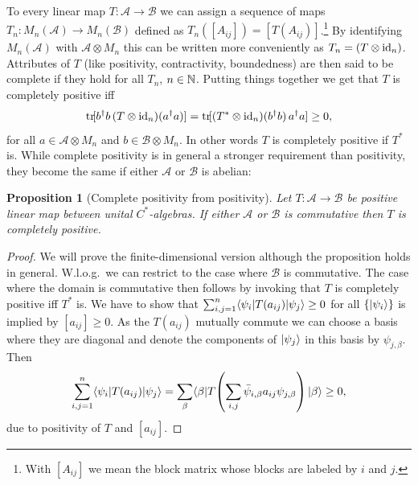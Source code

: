 \documentclass[11pt,a4paper]{article}
\theoremstyle{plain}
\newtheorem{proposition}{Proposition}[section]
\theoremstyle{definition}
\theoremstyle{remark}
\numberwithin{equation}{section}
\begin{document}
To every linear map $T:\mathcal{A}\to \mathcal{B}$ we can assign a sequence of maps $T_n:M_n(\mathcal{A})\to M_n(\mathcal{B})$ defined as $T_n([A_{ij}])=[T(A_{ij})]$.\footnote{With $[A_{ij}]$ we mean the block matrix whose blocks are labeled by $i$ and $j$.} By identifying $M_n(\mathcal{A})$ with $\mathcal{A}\otimes M_n$ this can be written more conveniently as $T_n=(T\otimes \mathrm{id}_n)$. Attributes of $T$ (like positivity, contractivity, boundedness) are then said to be complete if they hold for all $T_n$, $n\in \mathbb{N}$. Putting things together we get that $T$ is completely positive iff
\begin{equation}
    \operatorname{tr}\![b^\dagger b\,(T\otimes \mathrm{id}_n)(a^\dagger a)]
    = \operatorname{tr}\![(T^\ast\otimes \mathrm{id}_n)(b^\dagger b)\,a^\dagger a]\ge 0,
\end{equation}
for all $a\in \mathcal{A}\otimes M_n$ and $b\in \mathcal{B}\otimes M_n$. In other words $T$ is completely positive if $T^\ast$ is. While complete positivity is in general a stronger requirement than positivity, they become the same if either $\mathcal{A}$ or $\mathcal{B}$ is abelian:

\begin{proposition}[Complete positivity from positivity]
    Let $T:\mathcal{A}\to \mathcal{B}$ be positive linear map between unital $C^\ast$-algebras. If either $\mathcal{A}$ or $\mathcal{B}$ is commutative then $T$ is completely positive.
\end{proposition}

\begin{proof}
    We will prove the finite-dimensional version although the proposition holds in general. W.l.o.g.\ we can restrict to the case where $\mathcal{B}$ is commutative. The case where the domain is commutative then follows by invoking that $T$ is completely positive iff $T^\ast$ is. We have to show that $\sum_{i,j=1}^{n}\langle\psi_i|T(a_{ij})|\psi_j\rangle\ge 0$ for all $\{|\psi_i\rangle\}$ is implied by $[a_{ij}]\ge 0$. As the $T(a_{ij})$ mutually commute we can choose a basis where they are diagonal and denote the components of $|\psi_j\rangle$ in this basis by $\psi_{j,\beta}$. Then
    \begin{equation}
        \sum_{i,j=1}^{n}\langle\psi_i|T(a_{ij})|\psi_j\rangle
        =
        \sum_{\beta}\langle\beta|T\!\left(\sum_{i,j}\bar{\psi}_{i,\beta}a_{ij}\psi_{j,\beta}\right)|\beta\rangle\ge 0,
    \end{equation}
    due to positivity of $T$ and $[a_{ij}]$.
\end{proof}
\end{document}
